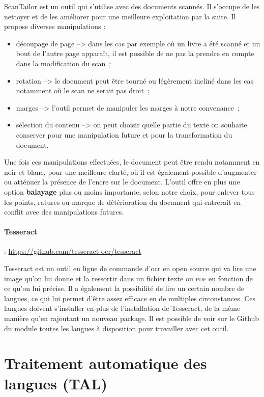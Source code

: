 ScanTailor est un outil qui s'utilise avec des documents scannés. Il s'occupe de les nettoyer et de les améliorer pour une meilleure exploitation par la suite. Il propose diverses manipulations : 
\begin{itemize}
    \item découpage de page --> dans les cas par exemple où un livre a été scanné et un bout de l'autre page apparaît, il est possible de ne pas la prendre en compte dans la modification du scan~;
    \item rotation --> le document peut être tourné ou légèrement incliné dans les cas notamment où le scan ne serait pas droit~;
    \item marges --> l'outil permet de manipuler les marges à notre convenance~;
    \item sélection du contenu --> on peut choisir quelle partie du texte on souhaite conserver pour une manipulation future et pour la transformation du document.
\end{itemize}
Une fois ces manipulations effectuées, le document peut être rendu notamment en noir et blanc, pour une meilleure clarté, où il est également possible d'augmenter ou atténuer la présence de l'encre sur le document. L'outil offre en plus une option \textbf{balayage} plus ou moins importante, selon notre choix, pour enlever tous les points, ratures ou marque de détérioration du document qui entrerait en conflit avec des manipulations futures.

\paragraph{Tesseract} : \url{https://github.com/tesseract-ocr/tesseract}

Tesseract est un outil en ligne de commande d'\acrshort{ocr} en open source qui va lire une image qu'on lui donne et la ressortir dans un fichier texte ou \textsc{pdf} en fonction de ce qu'on lui précise. Il a également la possibilité de lire un certain nombre de langues, ce qui lui permet d'être assez efficace en de multiples circonstances. Ces langues doivent s'installer en plus de l'installation de Tesseract, de la même manière qu'en rajoutant un nouveau package. Il est possible de voir sur le Github du module toutes les langues à disposition pour travailler avec cet outil.

\section{Traitement automatique des langues (TAL)}

